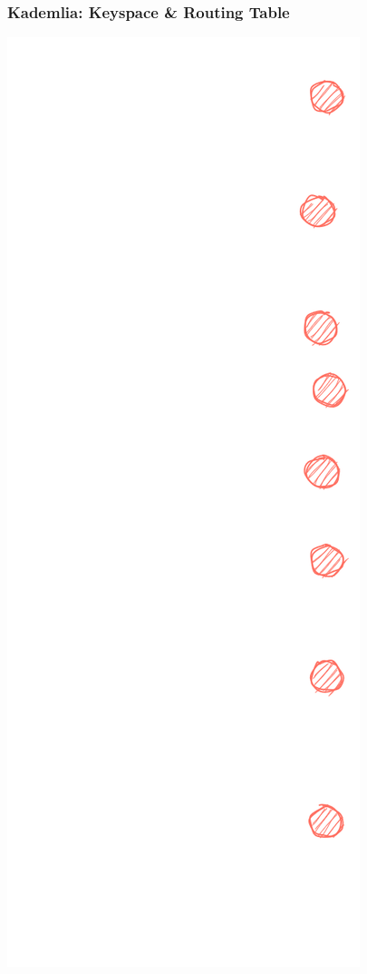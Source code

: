 \documentclass{../shipyard-slide}
\begin{document}
\begin{frame}
\frametitle{Kademlia: Keyspace \& Routing Table}

\hspace{4cm}\includegraphics[scale=.13]{resources/rt0-0.png}
\end{frame}
\end{document}
